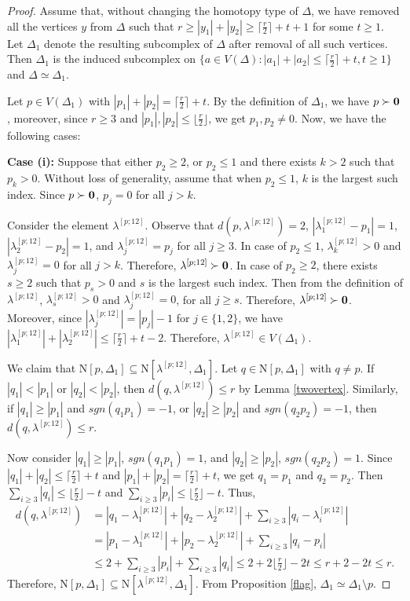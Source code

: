 \documentclass{amsart}
\theoremstyle{definition}
\theoremstyle{remark}
\numberwithin{equation}{section}
\newcommand{\D}{\Delta}
\newcommand{\f}{\lfloor\frac{r}{2}\rfloor}
\newcommand{\cil}{\lceil\frac{r}{2}\rceil}
\def\n{{\mathrm{N}}}
\begin{document}
\begin{proof}
	Assume that, without changing the homotopy type of  $\Delta$, we have removed all the vertices $y$ from $\Delta$ such that $r \geq |y_1| + |y_2| \geq \cil + t + 1$ for some $t \geq 1$.  Let  $\Delta_1$ denote the resulting subcomplex of $\Delta$ after removal of all such vertices. Then   $\Delta_1$ is the induced  subcomplex on  $\{a \in V(\D) : |a_1| + |a_2| \leq \cil + t, t\geq 1\}$ and $\Delta \simeq \Delta_1$.
	
	
	
	
	
	Let $p \in V(\D_1)$ with $|p_1| + |p_2| = \cil + t$. By the definition of $\D_1$,  we have $p \succ {\bf{0}}$, moreover, since $r \geq 3$ and $|p_1|, |p_2| \leq \f$, we get  $p_1, p_2 \neq 0$.  Now, we have the following cases:
	
	
	\noindent\textbf{Case (i):} 
	Suppose that either $p_2 \geq 2$, or $p_2\leq 1$ and there exists $k > 2$ such that $p_k>0$. Without loss of generality, assume that when $p_2 \leq 1 $,  $k$ is the largest such index. Since $p \succ {\bf{0}}$, $p_j =0$ for all $j > k$. 
	
	Consider the element $\lambda^{[p;12]}$. Observe that $d(p, \lambda^{[p;12]}) = 2$, $|\lambda^{[p;12]}_1 - p_1| = 1$, $|\lambda^{[p;12]}_2 - p_2| = 1$, and $\lambda^{[p;12]}_j = p_j$ for all $j \geq 3$.  In case of  $p_2\leq 1$, $\lambda^{[p;12]}_k > 0$ and $\lambda^{[p;12]}_j = 0$ for all $j > k$. Therefore, $\lambda^{[p;12]} \succ {\bf{0}}$. In case of $p_2\geq 2$, there exists $s\geq 2$ such that $p_s>0$ and $s$ is the largest such index. Then from the definition of $\lambda^{[p;12]}$, $\lambda^{[p;12]}_s>0$ and $\lambda^{[p;12]}_j=0$, for all $j\geq s$. Therefore, $\lambda^{[p;12]} \succ {\bf{0}}$. Moreover, since $|\lambda^{[p;12]}_j|=|p_j|-1$ for $j\in\{1,2\}$, we have $|\lambda^{[p;12]}_1|+|\lambda^{[p;12]}_2|\leq \cil + t-2$. Therefore, $\lambda^{[p;12]}\in V(\Delta_1)$.
	
	
	We claim that $\n[p, \D_1] \subseteq \n[\lambda^{[p;12]}, \D_1]$. Let $q \in \n[p, \D_1]$ with $q \neq p$. If $|q_1| < |p_1|$ or $|q_2| < |p_2|$, then $d(q, \lambda^{[p;12]}) \leq r$ by Lemma \ref{twovertex}. Similarly, if $|q_1| \geq |p_1|$ and $sgn(q_1 p_1) = -1$, or $|q_2| \geq |p_2|$ and $sgn(q_2 p_2) = -1$, then $d(q, \lambda^{[p;12]}) \leq r$.
	
	Now consider $|q_1| \geq |p_1|$, $sgn(q_1 p_1) = 1$, and $|q_2| \geq |p_2|$, $sgn(q_2 p_2) = 1$. Since $|q_1| + |q_2| \leq \cil + t$ and  $|p_1| + |p_2| = \cil + t$, we get $q_1 = p_1$ and $q_2 = p_2$. Then $\sum_{i \geq 3} |q_i| \leq \f -  t$ and $\sum_{i \geq 3} |p_i| \leq \f - t$. Thus,
	\begin{align*}
		d(q, \lambda^{[p;12]}) &= |q_1 - \lambda^{[p;12]}_1| + |q_2 - \lambda^{[p;12]}_2| + \sum_{i \geq 3} |q_i - \lambda^{[p;12]}_i|\\ &=  |p_1 - \lambda^{[p;12]}_1| + |p_2 - \lambda^{[p;12]}_2| + \sum_{i \geq 3} |q_i - p_i| \\
		& \leq 2 + \sum_{i \geq 3} |p_i| + \sum_{i \geq 3} |q_i| \leq 2 + 2\f - 2t\leq r + 2 - 2t \leq r. 
	\end{align*}
	Therefore, $\n[p, \D_1] \subseteq \n[\lambda^{[p;12]}, \D_1]$. From Proposition \ref{flag}, $\D_1 \simeq \D_1 \setminus p$.
	


\end{proof}
\end{document}
